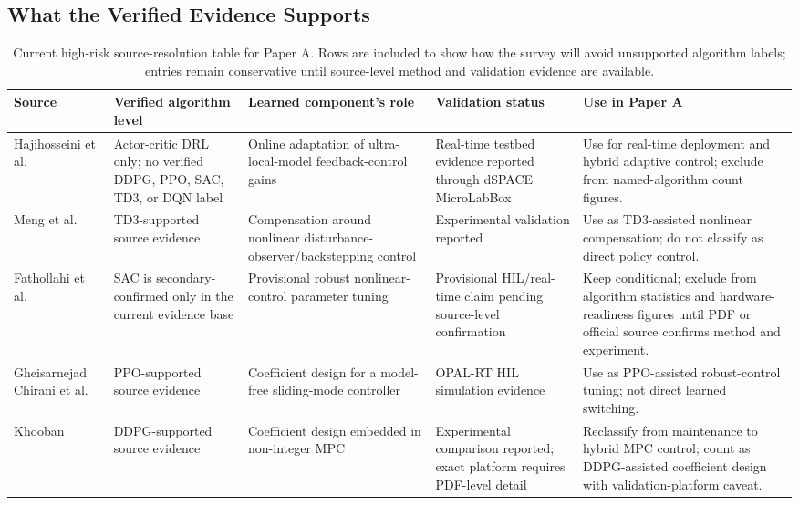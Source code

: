 \documentclass[manuscript,screen,review]{acmart}
\begin{document}
\subsection{What the Verified Evidence Supports}

\begin{table}[t]
\caption{Current high-risk source-resolution table for Paper A. Rows are included to show how the survey will avoid unsupported algorithm labels; entries remain conservative until source-level method and validation evidence are available.}
\label{tab:red-yellow-resolution}
\small
\begin{tabular}{p{}p{}p{}p{}p{}}
\toprule
Source & Verified algorithm level & Learned component's role & Validation status & Use in Paper A \\
\midrule
Hajihosseini et al.~\cite{hajihosseini2020dc} & Actor-critic DRL only; no verified DDPG, PPO, SAC, TD3, or DQN label & Online adaptation of ultra-local-model feedback-control gains & Real-time testbed evidence reported through dSPACE MicroLabBox & Use for real-time deployment and hybrid adaptive control; exclude from named-algorithm count figures. \\
Meng et al.~\cite{meng2022novel} & TD3-supported source evidence & Compensation around nonlinear disturbance-observer/backstepping control & Experimental validation reported & Use as TD3-assisted nonlinear compensation; do not classify as direct policy control. \\
Fathollahi et al.~\cite{fathollahi2023robust} & SAC is secondary-confirmed only in the current evidence base & Provisional robust nonlinear-control parameter tuning & Provisional HIL/real-time claim pending source-level confirmation & Keep conditional; exclude from algorithm statistics and hardware-readiness figures until PDF or official source confirms method and experiment. \\
Gheisarnejad Chirani et al.~\cite{gheisarnejad2022reducing} & PPO-supported source evidence & Coefficient design for a model-free sliding-mode controller & OPAL-RT HIL simulation evidence & Use as PPO-assisted robust-control tuning; not direct learned switching. \\
Khooban~\cite{khooban2022smartenance} & DDPG-supported source evidence & Coefficient design embedded in non-integer MPC & Experimental comparison reported; exact platform requires PDF-level detail & Reclassify from maintenance to hybrid MPC control; count as DDPG-assisted coefficient design with validation-platform caveat. \\
\bottomrule
\end{tabular}
\end{table}
\end{document}
